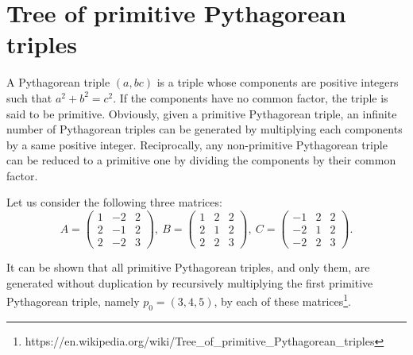 \documentclass[11pt, twoside, a4paper]{article}
\begin{document}
\section{Tree of primitive Pythagorean triples}
A Pythagorean triple $(a, b c)$ is a triple whose components are positive integers such that $a^2+b^2=c^2$. If the components have no common factor, the triple is said to be primitive. Obviously, given a primitive Pythagorean triple, an infinite number of Pythagorean triples can be generated by multiplying each components by a same positive integer. Reciprocally, any non-primitive Pythagorean triple can be reduced to a primitive one by dividing the components by their common factor.

Let us consider the following three matrices:
\[
A = \left(\begin{matrix}  1 & -2 & 2 \\  2 & -1 & 2 \\  2 & -2 & 3 \end{matrix} \right)\!,\ 
B = \left(\begin{matrix}  1 &  2 & 2 \\  2 &  1 & 2 \\  2 &  2 & 3 \end{matrix} \right)\!,\
C = \left(\begin{matrix} -1 &  2 & 2 \\ -2 &  1 & 2 \\ -2 &  2 & 3 \end{matrix} \right)\!.
\]

It can be shown that all primitive Pythagorean triples, and only them, are generated without duplication by recursively multiplying the first primitive Pythagorean triple, namely $p_0=(3, 4, 5)$, by each of these matrices\footnote{https://en.wikipedia.org/wiki/Tree\_of\_primitive\_Pythagorean\_triples}.
\end{document}
